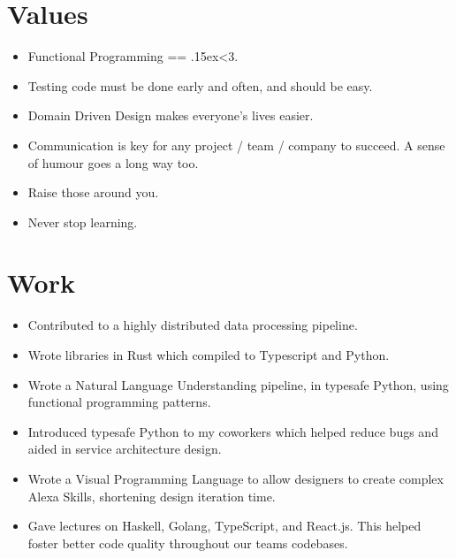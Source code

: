 \documentclass{jcgcv}
\begin{document}
\begin{column}



\section{Values}

\begin{itemize}
  \item Functional Programming == {\raise.15ex\hbox{<}}3.
  \item Testing code must be done early and often, and should be easy.
  \item Domain Driven Design makes everyone's lives easier.
  \item Communication is key for any project / team / company to succeed.
        A sense of humour goes a long way too.
  \item Raise those around you.
  \item Never stop learning.
\end{itemize}



\section{Work}

\begin{itemize}
  \item Contributed to a highly distributed data processing pipeline.
  \item Wrote libraries in Rust which compiled to Typescript and Python.
\end{itemize}

\begin{itemize}
  \item Wrote a Natural Language Understanding pipeline, in typesafe
        Python, using functional programming patterns.
  \item Introduced typesafe Python to my coworkers which helped reduce
        bugs and aided in service architecture design.
  \item Wrote a Visual Programming Language to allow designers to create
        complex Alexa Skills, shortening design iteration time.
  \item Gave lectures on Haskell, Golang, TypeScript, and React.js. This
        helped foster better code quality throughout our teams codebases.
\end{itemize}


\end{column}
\end{document}

